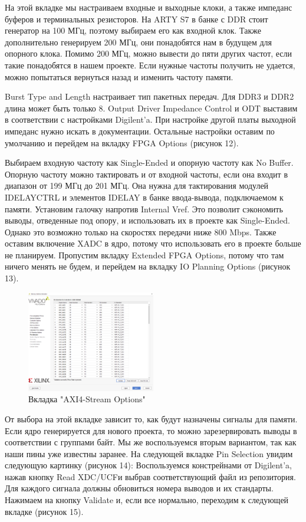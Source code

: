 \documentclass[a4paper,oneside ,10pt]{extreport}
\begin{document}
На этой вкладке мы настраиваем входные и выходные клоки, а также импеданс буферов и терминальных резисторов. На ARTY S7 в банке с DDR стоит генератор на 100 МГц, поэтому выбираем его как входной клок. Также дополнительно генерируем 200 МГц, они понадобятся нам в будущем для опорного клока. Помимо 200 МГц, можно вывести до пяти других частот, если такие понадобятся в нашем проекте. Если нужные частоты получить не удается, можно попытаться вернуться назад и изменить частоту памяти.

Burst Type and Length настраивает тип пакетных передач. Для DDR3 и DDR2 длина может быть только 8. Output Driver Impedance Control и ODT выставим в соответствии с настройками Digilent’a. При настройке другой платы выходной импеданс нужно искать в документации. Остальные настройки оставим по умолчанию и перейдем на вкладку FPGA Options (рисунок 12).
    
Выбираем входную частоту как Single-Ended и опорную частоту как No Buffer. Опорную частоту можно тактировать и от входной частоты, если она входит в диапазон от 199 МГц до 201 МГц. Она нужна для тактирования модулей IDELAYCTRL и элементов IDELAY в банке ввода-вывода, подключаемом к памяти. Установим галочку напротив Internal Vref. Это позволит сэкономить выводы, отведенные под опору, и использовать их в проекте как Single-Ended. Однако это возможно только на скоростях передачи ниже 800 Mbps. Также оставим включение XADC в ядро, потому что использовать его в проекте больше не планируем. Пропустим вкладку Extended FPGA Options, потому что там ничего менять не будем, и перейдем на вкладку IO Planning Options (рисунок 13).

\begin{figure}[h]
	\centering
	\includegraphics[width=0.5\textwidth]{image/mig_10.png}
	\caption{Вкладка "AXI4-Stream Options"}
	\label{cordic_axi4_stream_options}
\end{figure}
    
От выбора на этой вкладке зависит то, как будут назначены сигналы для памяти. Если ядро генерируется для нового проекта, то можно зарезервировать выводы в соответствии с группами байт. Мы же воспользуемся вторым вариантом, так как наши пины уже известны заранее. На следующей вкладке Pin Selection увидим следующую картинку (рисунок 14):
Воспользуемся констрейнами от Digilent’a, нажав кнопку Read XDC/UCFи выбрав соответствующий файл из репозитория. Для каждого сигнала должны обновиться номера выводов и их стандарты. Нажимаем на кнопку Validate и, если все нормально, переходим к следующей вкладке (рисунок 15).
\end{document}

